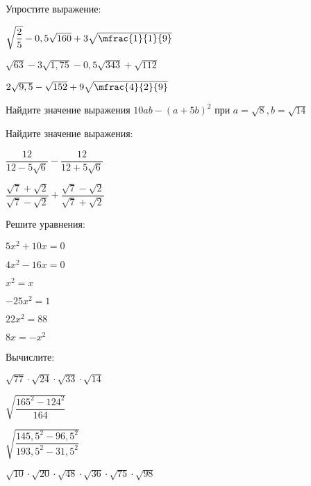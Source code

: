 \begin{homework}[number=2]
	\begin{listofex}
		\item Упростите выражение:
		 \begin{enumcols}[itemcolumns=2]
		 	\item \( \sqrt{\dfrac{2}{5}}-0,5\sqrt{160}+3\sqrt{\mfrac{1}{1}{9} }\)
		 	\item \( \sqrt{63}-3\sqrt{1,75}-0,5\sqrt{343}+\sqrt{112} \)
		 	\item \( 2\sqrt{9,5}-\sqrt{152}+9\sqrt{\mfrac{4}{2}{9}} \)
		 \end{enumcols}
	 \item Найдите значение выражения \( 10ab-(a+5b)^2 \) при \( a=\sqrt{8}, b=\sqrt{14} \)
	 \item Найдите значение выражения:
	  \begin{enumcols}[itemcolumns=2]
	 	\item \( \dfrac{12}{12-5\sqrt{6}}-\dfrac{12}{12+5\sqrt{6}} \)
	 	\item \( \dfrac{\sqrt{7}+\sqrt{2}}{\sqrt{7}-\sqrt{2}}+\dfrac{\sqrt{7}-\sqrt{2}}{\sqrt{7}+\sqrt{2}} \)
	 \end{enumcols}
 	\item Решите уравнения:
 	\begin{enumcols}[itemcolumns=3]
 		\item \( 5x^2+10x=0 \)
 		\item \( 4x^2-16x=0 \)
 		\item \( x^2=x \)
 		\item \( -25x^2=1 \)
 		\item \( 22x^2=88 \)
 		\item \( 8x=-x^2 \)
 	\end{enumcols}
 	\item Вычислите:
 	\begin{enumcols}[itemcolumns=2]
 		\item \( \sqrt{77}\cdot\sqrt{24}\cdot\sqrt{33}\cdot\sqrt{14} \)
 		\item \( \sqrt{\dfrac{165^2-124^2}{164}} \)
 		\item \( \sqrt{\dfrac{145,5^2-96,5^2}{193,5^2-31,5^2}} \)
 		\item \( \sqrt{10}\cdot\sqrt{20}\cdot\sqrt{48}\cdot\sqrt{36}\cdot\sqrt{75}\cdot\sqrt{98} \)
 	\end{enumcols}
	\end{listofex}
\end{homework}
%
%
